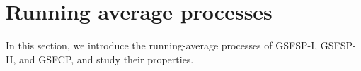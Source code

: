 \documentclass[11pt,oneside,reqno]{amsart}
\theoremstyle{definition}
\theoremstyle{remarkstyle}
\begin{document}

\section{Running average processes}\label{sec 11}
In this section, we introduce the running-average processes of GSFSP-I, GSFSP-II, and GSFCP, and study their properties.
\end{document}
